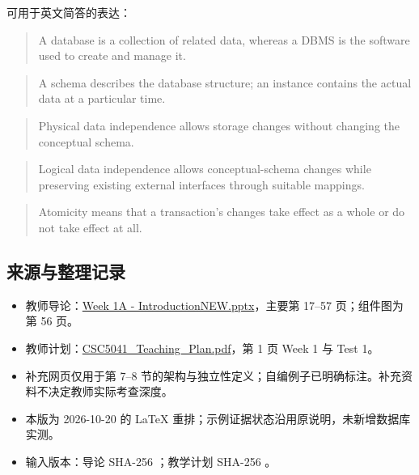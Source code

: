 可用于英文简答的表达：

\begin{quote}
A database is a collection of related data, whereas a DBMS is the software used to create and manage it.
\end{quote}

\begin{quote}
A schema describes the database structure; an instance contains the actual data at a particular time.
\end{quote}

\begin{quote}
Physical data independence allows storage changes without changing the conceptual schema.
\end{quote}

\begin{quote}
Logical data independence allows conceptual-schema changes while preserving existing external interfaces through suitable mappings.
\end{quote}

\begin{quote}
Atomicity means that a transaction's changes take effect as a whole or do not take effect at all.
\end{quote}

\subsection{来源与整理记录}\label{01_database_fundamentals_zh-ux6765ux6e90ux4e0eux6574ux7406ux8bb0ux5f55}

\begin{itemize}
\tightlist
\item
  教师导论：\href{../../../slides/Week\%201A\%20-\%20IntroductionNEW.pptx}{Week 1A - IntroductionNEW.pptx}，主要第 17--57 页；组件图为第 56 页。
\item
  教师计划：\href{../../../slides/CSC5041_Teaching_Plan.pdf}{CSC5041\_Teaching\_Plan.pdf}，第 1 页 Week 1 与 Test 1。
\item
  补充网页仅用于第 7--8 节的架构与独立性定义；自编例子已明确标注。补充资料不决定教师实际考查深度。
\item
  本版为 2026-10-20 的 LaTeX 重排；示例证据状态沿用原说明，未新增数据库实测。
\item
  输入版本：导论 SHA-256 \texttt{}；教学计划 SHA-256 \texttt{}。
\end{itemize}
